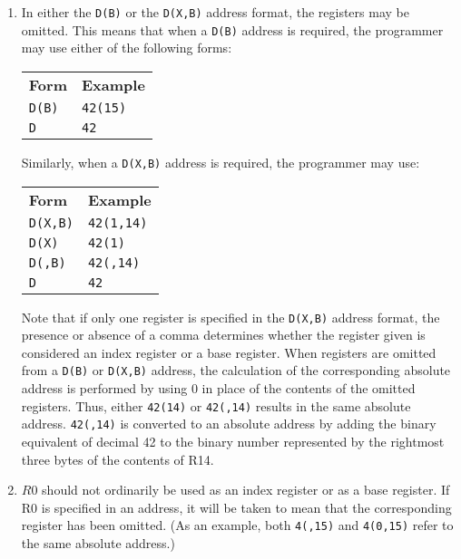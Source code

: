 \documentclass{report}
\begin{document}
\begin{itemize}
\begin{enumerate}
                \item In either the \texttt{D(B)} or the \texttt{D(X,B)} address format, the registers may be omitted. This means that when a \texttt{D(B)} address is required, the programmer may use either of the following forms:
                    \begin{center}
                        \begin{tabular}{ll}
                            \textbf{Form} & \textbf{Example} \\
                            \texttt{D(B)} & \texttt{42(15)} \\
                            \texttt{D}    & \texttt{42}
                        \end{tabular}
                    \end{center}
                    Similarly, when a \texttt{D(X,B)} address is required, the programmer may use:
                    \begin{center}
                        \begin{tabular}{ll}
                            \textbf{Form} & \textbf{Example} \\
                            \texttt{D(X,B)} & \texttt{42(1,14)} \\
                            \texttt{D(X)}   & \texttt{42(1)} \\
                            \texttt{D(,B)}  & \texttt{42(,14)} \\
                            \texttt{D}      & \texttt{42}
                        \end{tabular}
                    \end{center}
                    Note that if only one register is specified in the \texttt{D(X,B)} address format, the presence or absence of a comma determines whether the register given is considered an index register or a base register.
                    \bigbreak \noindent 
                    When registers are omitted from a \texttt{D(B)} or \texttt{D(X,B)} address, the calculation of the corresponding absolute address is performed by using 0 in place of the contents of the omitted registers. Thus, either \texttt{42(14)} or \texttt{42(,14)} results in the same absolute address.
                    \texttt{42(,14)} is converted to an absolute address by adding the binary equivalent of decimal 42 to the binary number represented by the rightmost three bytes of the contents of R14.
                \item $R0$ should not ordinarily be used as an index register or as a base register. If R0 is specified in an address, it will be taken to mean that the corresponding register has been omitted. (As an example, both \texttt{4(,15)} and \texttt{4(0,15)} refer to the same absolute address.)

\end{enumerate}
\end{itemize}
\end{document}
